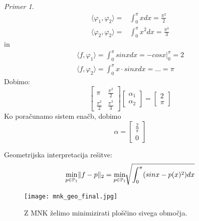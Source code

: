 \documentclass[a4paper,12pt]{article}
\DeclarePairedDelimiter\norm{\lVert}{\rVert}
\newcommand{\innerproduct}[2]{\langle #1, #2 \rangle}
\theoremstyle{definition}
\theoremstyle{remark}
\newtheorem*{ex}{Primer}
\newcommand{\Pp}{\mathbb{P}}
\begin{document}
\begin{ex}
\begin{align*}
        \innerproduct{\varphi_1}{\varphi_2} =& \int_{0}^{\pi} x dx = \frac{\pi^2}{2} \\
        \innerproduct{\varphi_2}{\varphi_2} =& \int_{0}^{\pi} x^2 dx = \frac{\pi^3}{3}
    \end{align*}
    in
    \begin{align*}
        \innerproduct{f}{\varphi_1} = \int_{0}^{\pi} sin x dx = - cos x \Biggr|_{0}^{\pi} = 2 \\
        \innerproduct{f}{\varphi_2} = \int_{0}^{\pi} x \cdot sin x dx = \dots = \pi
    \end{align*}
    Dobimo:
    \begin{equation*}
        \begin{bmatrix}
            \pi & \frac{\pi^2}{2} \\
            \frac{\pi^2}{2} & \frac{\pi^3}{3}
        \end{bmatrix}
        \begin{bmatrix}
            \alpha_1 \\
            \alpha_2
        \end{bmatrix}
        =
        \begin{bmatrix}
            2 \\
            \pi
        \end{bmatrix}
    \end{equation*}
    Ko poračunamo sistem enačb, dobimo
    \begin{equation*}
        \alpha =
        \begin{bmatrix}
            \frac{2}{\pi} \\
            0
        \end{bmatrix}
    \end{equation*}

    Geometrijska interpretacija rešitve:
    \begin{equation*}
        \min_{p \in \Pp_1} \norm{f - p}_2 = \min_{p \in \Pp_1} \sqrt[]{\int_{0}^{\pi} (sinx - p(x)^2) dx}
    \end{equation*}

    \begin{figure}[H]
        \center
        \texttt{[image: mnk\_geo\_final.jpg]}
        \caption{Z MNK želimo minimizirati ploščino sivega območja.}
    \end{figure}
\end{ex}
\end{document}
